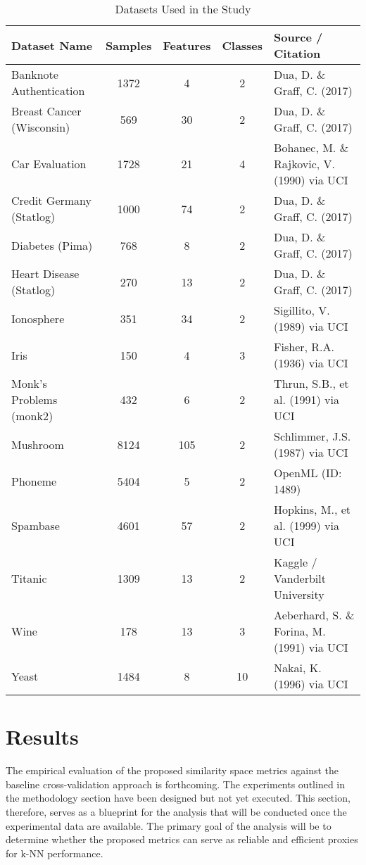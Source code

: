 \documentclass[conference]{IEEEtran}
\begin{document}
\begin{table*}[htbp]
\caption{Datasets Used in the Study}
\label{tab:datasets}
\begin{center}
\begin{tabular}{|l|c|c|c|l|}
\hline
\textbf{Dataset Name} & \textbf{Samples} & \textbf{Features} & \textbf{Classes} & \textbf{Source / Citation} \\
\hline
Banknote Authentication & 1372 & 4 & 2 & Dua, D. \& Graff, C. (2017) \cite{b53, b54} \\
Breast Cancer (Wisconsin) & 569 & 30 & 2 & Dua, D. \& Graff, C. (2017) \cite{b54, b55} \\
Car Evaluation & 1728 & 21 & 4 & Bohanec, M. \& Rajkovic, V. (1990) via UCI \cite{b54, b56} \\
Credit Germany (Statlog) & 1000 & 74 & 2 & Dua, D. \& Graff, C. (2017) \cite{b54, b57} \\
Diabetes (Pima) & 768 & 8 & 2 & Dua, D. \& Graff, C. (2017) \cite{b54, b58} \\
Heart Disease (Statlog) & 270 & 13 & 2 & Dua, D. \& Graff, C. (2017) \cite{b54, b59} \\
Ionosphere & 351 & 34 & 2 & Sigillito, V. (1989) via UCI \cite{b54, b60} \\
Iris & 150 & 4 & 3 & Fisher, R.A. (1936) via UCI \cite{b54, b61} \\
Monk's Problems (monk2) & 432 & 6 & 2 & Thrun, S.B., et al. (1991) via UCI \cite{b54, b62} \\
Mushroom & 8124 & 105 & 2 & Schlimmer, J.S. (1987) via UCI \cite{b54, b63} \\
Phoneme & 5404 & 5 & 2 & OpenML (ID: 1489) \cite{b64} \\
Spambase & 4601 & 57 & 2 & Hopkins, M., et al. (1999) via UCI \cite{b65, b66} \\
Titanic & 1309 & 13 & 2 & Kaggle / Vanderbilt University \cite{b67} \\
Wine & 178 & 13 & 3 & Aeberhard, S. \& Forina, M. (1991) via UCI \cite{b68, b69} \\
Yeast & 1484 & 8 & 10 & Nakai, K. (1996) via UCI \cite{b70, b71} \\
\hline
\end{tabular}
\end{center}
\end{table*}

\section{Results}
The empirical evaluation of the proposed similarity space metrics against the baseline cross-validation approach is forthcoming. The experiments outlined in the methodology section have been designed but not yet executed. This section, therefore, serves as a blueprint for the analysis that will be conducted once the experimental data are available. The primary goal of the analysis will be to determine whether the proposed metrics can serve as reliable and efficient proxies for k-NN performance.
\end{document}
